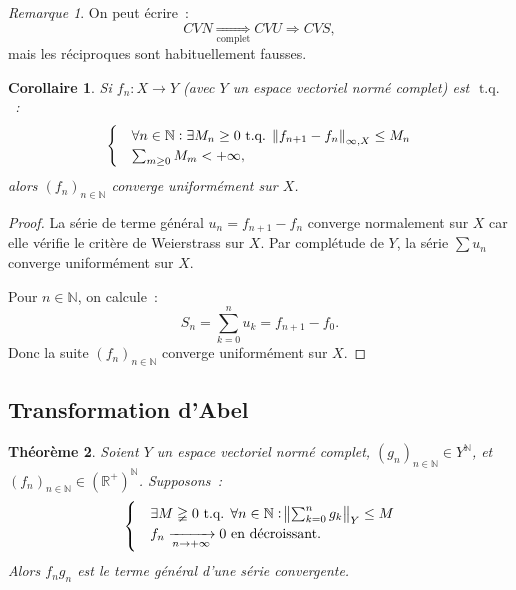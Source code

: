 \documentclass{report}
\newtheorem{thm}{Théorème}[chapter]
\newtheorem{cor}[thm]{Corollaire}
\theoremstyle{definition}
\theoremstyle{remark}
\newtheorem*{rmq}{Remarque}
\newcommand{\R}{\mathbb R}
\newcommand{\Rp}{\R^{+}}
\newcommand{\N}{\mathbb N}
\newcommand{\tq}{\text{ t.q. }}
\newcommand{\seq}[3]{\left(#1_{#2}\right)_{#2 \in #3}}
\newcommand{\mconv}[3]{\xrightarrow[#1 \to #2]{#3}}
\newcommand{\pinfty}{{+\infty}}
\newcommand{\evn}{espace vectoriel normé}
\newcommand{\evnc}{{\evn} complet}
\begin{document}
			\begin{rmq} On peut écrire~:
			\[CVN \underset {\text{complet}}\Rightarrow CVU \Rightarrow CVS,\]
			mais les réciproques sont habituellement fausses.
			\end{rmq}
			\begin{cor} Si $f_n : X \to Y$ (avec $Y$ un \evnc) est $\tq$~:
			\begin{align*}
				\begin{cases}
					&\forall n \in \N : \exists M_n \geq 0 \tq \norm {f_{n+1} - f_n}_{\infty, X} \leq M_n \\
					&\sum_{m \geq 0}M_m < \pinfty,
				\end{cases}
			\end{align*}
			alors $\seq fn\N$ converge uniformément sur $X$.
			\end{cor}

			\begin{proof} La série de terme général $u_n = f_{n+1}-f_n$ converge normalement sur $X$ car elle vérifie le critère de Weierstrass sur $X$. Par
			complétude de $Y$, la série $\sum u_n$ converge uniformément sur $X$.

			Pour $n \in \N$, on calcule~:
			\[S_n = \sum_{k=0}^nu_k = f_{n+1}-f_0.\]
			Donc la suite $\seq fn\N$ converge uniformément sur $X$.
			\end{proof}

		\subsection{Transformation d'Abel}
			\begin{thm} Soient $Y$ un \evnc, $\seq gn\N \in Y^{\N}$, et $\seq fn\N \in (\Rp)^{\N}$. Supposons~:
			\[
				\begin{cases}
					&\exists M \gneqq 0 \tq \forall n \in \N : \norm {\sum_{k=0}^ng_k}_Y \leq M \\
					&f_n  \mconv n\pinfty{} 0\text{ en décroissant.}
				\end{cases}
			\]
			Alors $f_ng_n$ est le terme général d'une série convergente.
			\end{thm}
\end{document}
